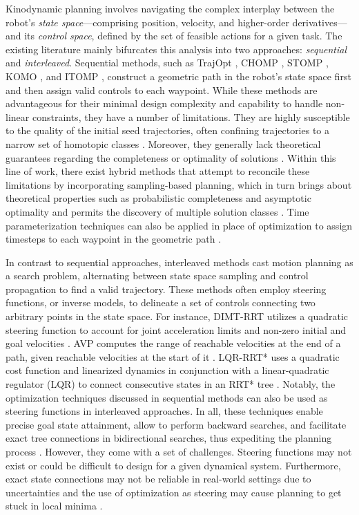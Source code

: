 Kinodynamic planning involves navigating the complex interplay between the robot's \textsl{state space}---comprising position, velocity, and higher-order derivatives---and its \textsl{control space}, defined by the set of feasible actions for a given task.
The existing literature mainly bifurcates this analysis into two approaches: \textsl{sequential} and \textsl{interleaved}.
Sequential methods, such as TrajOpt \cite{schulman2013finding}, CHOMP \cite{ratliff2009chomp}, STOMP \cite{kalakrishnan2011stomp}, KOMO \cite{toussaint2014newton}, and ITOMP \cite{park2012itomp},
construct a geometric path in the robot's state space first and then assign valid controls to each waypoint.
While these methods are advantageous for their minimal design complexity and capability to handle non-linear constraints, they have a number of limitations.
They are highly susceptible to the quality of the initial seed trajectories, often confining trajectories to a narrow set of homotopic classes \cite{schulman2013finding,ichnowski2020deep}.
Moreover, they generally lack theoretical guarantees regarding the completeness or optimality of solutions \cite{kuntz2019fast}.
Within this line of work, there exist hybrid methods that attempt to reconcile these limitations by incorporating sampling-based planning, which in turn brings about theoretical properties such as probabilistic completeness and asymptotic optimality \cite{kuntz2019fast} and permits the discovery of multiple solution classes \cite{kamat2022bitkomo}.
Time parameterization techniques can also be applied in place of optimization to assign timesteps to each waypoint in the geometric path \cite{pham2014general,Berscheid-RSS-21,macfarlane}.

In contrast to sequential approaches, interleaved methods cast motion planning as a search problem, alternating between state space sampling and control propagation to find a valid trajectory.
These methods often employ steering functions, or inverse models, to delineate a set of controls connecting two arbitrary points in the state space.
For instance, DIMT-RRT utilizes a quadratic steering function to account for joint acceleration limits and non-zero initial and goal velocities \cite{kunz2014probabilistically}.
AVP computes the range of reachable velocities at the end of a path, given reachable velocities at the start of it \cite{pham2013kinodynamic,johnson2012optimal}.
LQR-RRT* uses a quadratic cost function and linearized dynamics in conjunction with a linear-quadratic regulator (LQR) to connect consecutive states in an RRT* tree \cite{perez2012lqr,caldwell2018fast}.
Notably, the optimization techniques discussed in sequential methods can also be used as steering functions in interleaved approaches.
In all, these techniques enable precise goal state attainment, allow to perform backward searches, and facilitate exact tree connections in bidirectional searches, thus expediting the planning process \cite{lavalle2006planning}.
However, they come with a set of challenges. Steering functions may not exist or could be difficult to design for a given dynamical system. Furthermore, exact state connections may not be reliable in real-world settings due to uncertainties and the use of optimization as steering may cause planning to get stuck in local minima \cite{littlefield2020efficient}.

